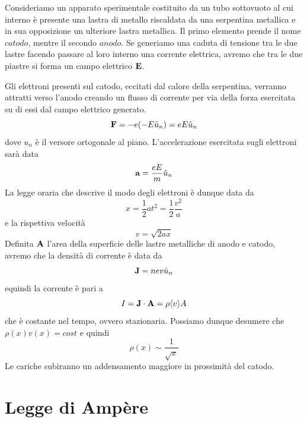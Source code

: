 Consideriamo un apparato sperimentale costituito da un tubo sottovuoto al cui interno \`e presente  una lastra di metallo riscaldata da una serpentina metallica e in sua opposizione un ulteriore lastra metallica. Il primo elemento prende il nome $catodo$, mentre il secondo $anodo$. Se generiamo una caduta di tensione tra le due lastre facendo passare al loro interno una corrente elettrica, avremo che tra le due piastre si forma un campo elettrico $\bold{E}$.

 Gli elettroni presenti sul catodo, eccitati dal calore della serpentina, verranno attratti verso l'anodo creando un flusso di corrente per via della forza esercitata su di essi dal campo elettrico generato.
\begin{equation*}
	\bold{F} = -e (-E \hat{u}_{n}) =eE \hat{u}_{n}
\end{equation*}
dove $u_n$ \`e il versore ortogonale al piano. L'accelerazione esercitata sugli elettroni sar\`a data 
\begin{equation*}
	\bold{a} = \frac{eE}{m}\hat{u}_n
\end{equation*}
La legge oraria che descrive il modo degli elettroni \`e dunque data da 
\begin{equation*}
	x = \frac{1}{2}at^2 = \frac{1}{2}\frac{v^2}{a} 
\end{equation*}
e la rispettiva velocit\`a
\begin{equation*}
	v = \sqrt{2ax}
\end{equation*}
Definita $\bold{A}$ l'area della superficie delle lastre metalliche di anodo e catodo, avremo che la densit\`a di corrente \`e data da 
\begin{equation*}
	\bold{J} = nev \hat{u}_n
\end{equation*}
 equindi la corrente \`e pari a 
 \begin{equation*}
 	I = \bold{J} \cdot \bold{A} = \rho \langle v \rangle A 
 \end{equation*}
 che \`e costante nel tempo, ovvero stazionaria. Possiamo dunque desumere che $\rho(x)v(x) = cost $ e quindi 
 \begin{equation*}
 	\rho(x) \sim \frac{1}{\sqrt{x}}
 \end{equation*}
 Le cariche subiranno un addensamento maggiore in prossimit\`a del catodo.
 

 \section{Legge di Amp\`ere}

